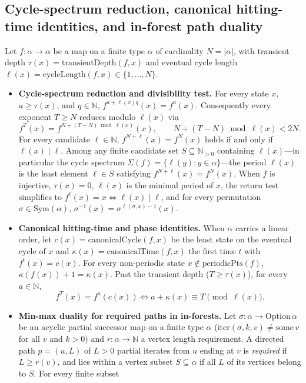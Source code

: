\begin{result}
\subsection{Cycle-spectrum reduction, canonical hitting-time identities, and in-forest path duality}
Let $f:\alpha\to\alpha$ be a map on a finite type $\alpha$ of cardinality $N=|\alpha|$, with
transient depth $\tau(x)=\mathrm{transientDepth}(f,x)$ and eventual cycle length
$\ell(x)=\mathrm{cycleLength}(f,x)\in\{1,\dots,N\}$.
\begin{itemize}
\item \textbf{Cycle-spectrum reduction and divisibility test.}
For every state $x$, $a\ge\tau(x)$, and $q\in\mathbb N$, $f^{a+\ell(x)q}(x)=f^a(x)$.
Consequently every exponent $T\ge N$ reduces modulo $\ell(x)$ via
\[
f^T(x)=f^{N+(T-N)\bmod\ell(x)}(x),\qquad N+(T-N)\bmod\ell(x)<2N.
\]
For every candidate $\ell\in\mathbb N$, $f^{N+\ell}(x)=f^N(x)$ holds if and only if
$\ell(x)\mid\ell$. Among any finite candidate set $S\subseteq\mathbb N_{>0}$ containing
$\ell(x)$---in particular the cycle spectrum $\Sigma(f)=\{\ell(y):y\in\alpha\}$---the period
$\ell(x)$ is the least element $\ell\in S$ satisfying $f^{N+\ell}(x)=f^N(x)$. When $f$ is
injective, $\tau(x)=0$, $\ell(x)$ is the minimal period of $x$, the return test simplifies to
$f^\ell(x)=x\iff\ell(x)\mid\ell$, and for every permutation $\sigma\in\mathrm{Sym}(\alpha)$,
$\sigma^{-1}(x)=\sigma^{\ell(\sigma,x)-1}(x)$.
\item \textbf{Canonical hitting-time and phase identities.}
When $\alpha$ carries a linear order, let $c(x)=\mathrm{canonicalCycle}(f,x)$ be the least state
on the eventual cycle of $x$ and $\kappa(x)=\mathrm{canonicalTime}(f,x)$ the first time $t$ with
$f^t(x)=c(x)$. For every non-periodic state $x\notin\mathrm{periodicPts}(f)$,
$\kappa(f(x))+1=\kappa(x)$. Past the transient depth ($T\ge\tau(x)$), for every $a\in\mathbb N$,
\[
f^T(x)=f^a(c(x))\iff a+\kappa(x)\equiv T\pmod{\ell(x)}.
\]
\item \textbf{Min-max duality for required paths in in-forests.}
Let $\sigma:\alpha\to\mathrm{Option}\,\alpha$ be an acyclic partial successor map on a finite
type $\alpha$ ($\mathrm{iter}(\sigma,k,v)\ne\mathrm{some}\,v$ for all $v$ and $k>0$) and
$r:\alpha\to\mathbb N$ a vertex length requirement. A directed path $p=(u,L)$ of $L>0$ partial
iterates from $u$ ending at $v$ is \emph{required} if $L\ge r(v)$, and lies within a vertex subset
$S\subseteq\alpha$ if all $L$ of its vertices belong to $S$. For every finite subset

\end{itemize}
\end{result}
